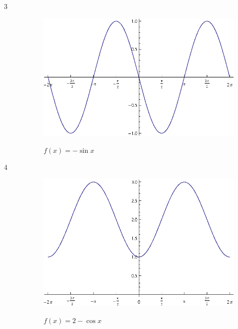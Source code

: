 \documentclass{exam}
\begin{document}
\begin{description}
      \item[3]
        \begin{figure}[H]
          \centering
          \includegraphics[scale=0.8]{exercise03.eps}

          $f(x) = -\sin x$
        \end{figure}

      \item[4]
        \begin{figure}[H]
          \centering
          \includegraphics[scale=0.8]{exercise04.eps}

          $f(x) = 2 - \cos x$
        \end{figure}


\end{description}
\end{document}
